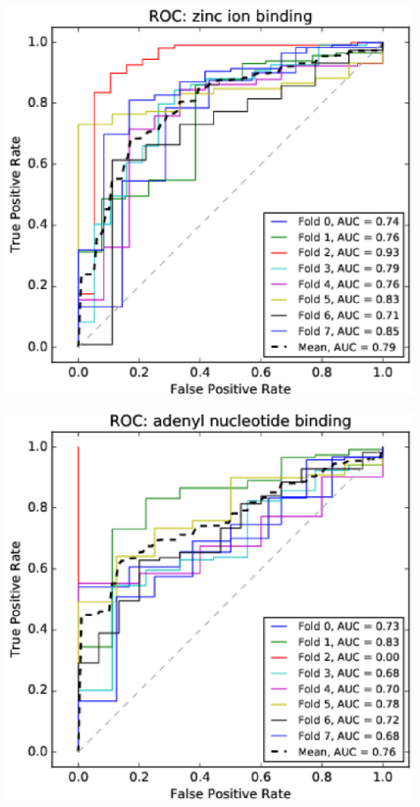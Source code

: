\documentclass[11pt,twoside,a4paper]{book}
\newenvironment{Figure}
  {\par\medskip\noindent\minipage{\linewidth}}
  {\endminipage\par\medskip}
\begin{document}
\begin{multicols}{2}
\begin{Figure}\begin{center}\includegraphics[width=\linewidth]{figures/roc_zinc_ion_binding}\label{fig:roc_zinc_ion_binding}\end{center}\end{Figure}
\begin{Figure}\begin{center}\includegraphics[width=\linewidth]{figures/roc_adenyl_nucleotide_binding}\label{fig:roc_adenyl_nucleotide_binding}\end{center}\end{Figure}

\end{multicols}
\end{document}
